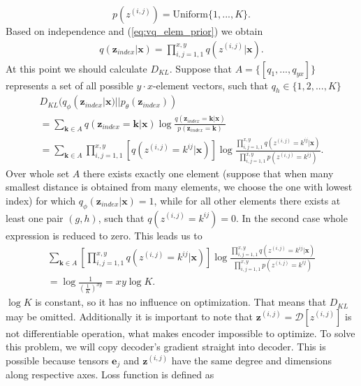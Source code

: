 \documentclass[10pt]{article}
\begin{document}
\begin{equation}
    p(z^{(i,j)}) = \text{Uniform} \{1, ... , K \}.
\end{equation}
Based on independence and (\ref{eq:vq_elem_prior}) we obtain
\begin{gather}
     q( \textbf{z}_{index} | \textbf{x}) = \prod_{i,j = 1,1}^{x, y}    
     q( z^{(i,j)} | \textbf{x}).
\end{gather}
At this point we should calculate $D_{KL}$. Suppose that $A = \{[q_1, ..., q_{yx}] \}$
represents a set of all possible $y \cdot x$-element vectors, such that $q_h \in \{ 1, 2, ..., K\}$
\begin{gather} 
    D_{KL}(q_{\phi }(\textbf{z}_{index}|\textbf{x})  || p_{\theta }(\textbf{z}_{index}) ) \\
    = \sum_{\textbf{k} \in A} q(\textbf{z}_{index} = \textbf{k} | \textbf{x}) \log\frac{q(\textbf{z}_{index} = \textbf{k} | \textbf{x})}{ p (\textbf{z}_{index}  = \textbf{k})} \\ 
     = \sum_{\textbf{k} \in A} \prod_{i,j = 1,1}^{x, y} \left[q(z^{(i,j)} = k^{ij} | \textbf{x}) \right]\log\frac{\prod_{i,j = 1,1}^{x, y} q(z^{(i,j)} = k^{ij}| \textbf{x})}
     {\prod_{i,j = 1,1}^{x, y}  p (z^{(i,j)} = k^{ij})}.
\end{gather}
Over whole set $A$ there exists exactly one element (suppose that when many smallest distance is obtained from many elements, we choose the one with lowest index) for which  
$q_{\phi }(\textbf{z}_{index}|\textbf{x}) = 1$, while for all other elements
there exists at least one pair $(g,h)$, such that $q(z^{(i,j)} = k^{ij}) = 0$. In the second case whole expression is reduced to zero. This leads us to 
\begin{gather}
    \sum_{\textbf{k} \in A}\left[ \prod_{i,j = 1,1}^{x, y}q(z^{(i,j)} = k^{ij} | \textbf{x}) \right]\log\frac{\prod_{i,j = 1,1}^{x, y} q(z^{(i,j)} = k^{ij}| \textbf{x})}
     {\prod_{i,j = 1,1}^{x, y}  p (z^{(i,j)} = k^{ij})} \\
     = \log \frac{1}{(\frac{1}{K})^{xy}} = xy\log K.
\end{gather}
$\log K$ is constant, so it has no influence on optimization. That means that $D_{KL}$ may be omitted. Additionally it is important to note that $\textbf{z}^{(i,j)} =  \mathcal{D}[z^{(i,j)}]$  is not differentiable operation, what makes encoder impossible to optimize. To solve this problem, we will copy decoder's gradient straight into decoder. This is possible because tensors $\textbf{e}_j$ and $\textbf{z}^{(i,j)}$ have the same degree and dimensions along respective axes. Loss function is defined as 
\end{document}
